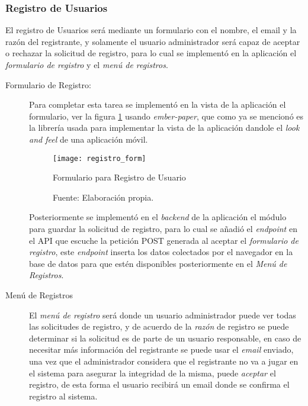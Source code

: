 \subsubsection{Registro de Usuarios}

El registro de Usuarios será mediante un formulario con el nombre, el email y la razón del registrante, y solamente el usuario administrador será capaz de aceptar o rechazar la solicitud de registro, para lo cual se implementó en la aplicación el \emph{formulario de registro} y el \emph{menú de registros}. \\



\begin{description}
  \item[Formulario de Registro:] Para completar esta tarea se implementó en la vista de la aplicación el formulario, ver la figura \ref{fig:registro_form} usando \emph{ember-paper}, que como ya se mencionó es la librería usada para implementar la vista de la aplicación dandole el \emph{look and feel} de una aplicación móvil. \\

  \begin{figure}[H]
        \begin{center}
          \texttt{[image: registro\_form]}

          \caption{Formulario para Registro de Usuario}
          \label{fig:registro_form}
          \caption*{Fuente: Elaboración propia.}
        \end{center}
  \end{figure}


  Posteriormente se implementó en el \emph{backend} de la aplicación el módulo para guardar la solicitud de registro, para lo cual se  añadió el \emph{endpoint} en el API que escuche la petición POST generada al aceptar el \emph{formulario de registro}, este \emph{endpoint} inserta los datos colectados por el navegador en la base de datos para que estén disponibles posteriormente en el \emph{Menú de Registros}.\\


  \item[Menú de Registros] El \emph{menú de registro} será donde un usuario administrador puede ver todas las solicitudes de registro, y de acuerdo de la \emph{razón} de registro se puede determinar si la solicitud es de parte de un usuario responsable, en caso de necesitar más información del registrante se puede usar el \emph{email} enviado, una vez que el administrador considera que el registrante no va a jugar en el sistema para asegurar la integridad de la misma, puede \emph{aceptar} el registro, de esta forma el usuario recibirá un email donde se confirma el registro al sistema.\\





\end{description}


